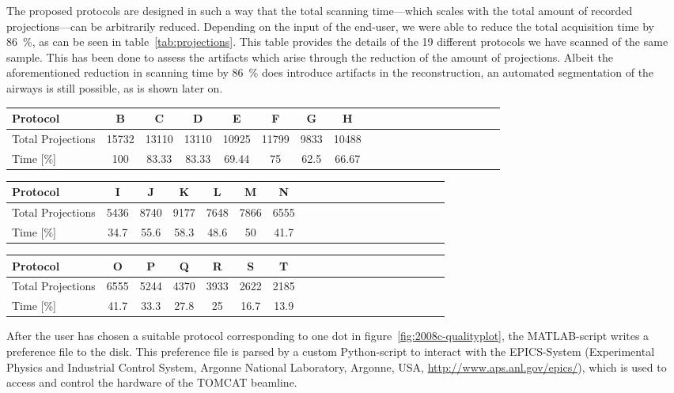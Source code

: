 The proposed protocols are designed in such a way that the total scanning time---which scales with the total amount of recorded projections---can be arbitrarily reduced. Depending on the input of the end-user, we were able to reduce the total acquisition time by \SI{86}{\percent}, as can be seen in table~\ref{tab:projections}. This table provides the details of the 19 different protocols we have scanned of the same sample. This has been done to assess the artifacts which arise through the reduction of the amount of projections. Albeit the aforementioned reduction in scanning time by \SI{86}{\percent} does introduce artifacts in the reconstruction, an automated segmentation of the airways is still possible, as is shown later on.

\begin{table*}
	\centering
	\caption{Specification of different protocols and time used compared to gold standard}
	\begin{tabular*}{\textwidth}{l@{\extracolsep\fill}ccccccccccccccccccc}
		\toprule
		Protocol 			& B & C & D & E & F & G & H\\
		\midrule
		Total Projections 	& 15732 & 13110 & 13110 & 10925 & 11799 & 9833 & 10488\\
		Time [\%] 			& 100 & 83.33 & 83.33 & 69.44 & 75 & 62.5 & 66.67\\
		\bottomrule
	\end{tabular*}
	\begin{tabular*}{\textwidth}{l@{\extracolsep\fill}ccccccccccccccccccc}
		\toprule
		Protocol 			& I & J & K & L & M & N \\
		\midrule
		Total Projections 	& 5436 & 8740 & 9177 & 7648 & 7866 & 6555 \\
		Time [\%] 			& 34.7 & 55.6 & 58.3 & 48.6 & 50 & 41.7 \\
 		\bottomrule
	\end{tabular*}
	\begin{tabular*}{\textwidth}{l@{\extracolsep\fill}ccccccccccccccccccc}
		\toprule
		Protocol 			& O & P & Q & R & S & T \\
		\midrule
		Total Projections 	& 6555 & 5244 & 4370 & 3933 & 2622 & 2185 \\
		Time [\%] 			& 41.7 & 33.3 & 27.8 & 25 & 16.7 & 13.9 \\
		\bottomrule
	\end{tabular*}
	\label{tab:projections}
\end{table*}

After the user has chosen a suitable protocol corresponding to one dot in figure~\ref{fig:2008c-qualityplot}, the MATLAB-script writes a preference file to the disk. This preference file is parsed by a custom Python-script to interact with the EPICS-System (Experimental Physics and Industrial Control System, Argonne National Laboratory, Argonne, USA, \url{http://www.aps.anl.gov/epics/}), which is used to access and control the hardware of the TOMCAT beamline.

